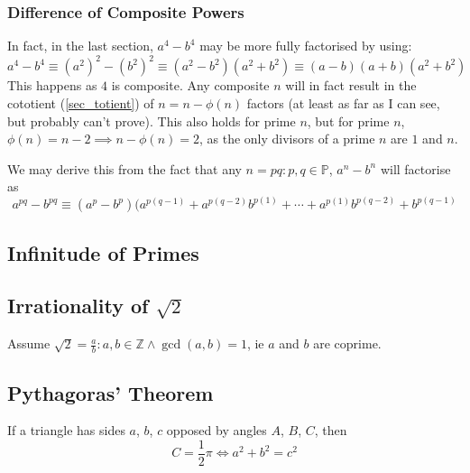 \documentclass[fleqn,a4paper,11pt]{article}
\begin{document}
    \subsubsection{Difference of Composite Powers}

    In fact, in the last section, \(a^4 - b^4\) may be more fully factorised by
    using:
    \begin{equation*}
    a^4 - b^4 \equiv (a^2)^2 - (b^2)^2 \equiv (a^2 - b^2)(a^2 + b^2) \equiv
        (a - b)(a + b)(a^2 + b^2)
    \end{equation*}
    This happens as \(4\) is composite. Any composite \(n\) will in fact result
    in the cototient (\ref{sec_totient}) of \(n = n - \phi(n)\) factors (at
    least as far as I can see, but probably can't prove). This
    also holds for prime \(n\), but for prime \(n\),
    \(\phi(n) = n - 2 \implies n - \phi(n) = 2\), as the only divisors of
    a prime \(n\) are \(1\) and \(n\).

    We may derive this from the fact that any \(n = pq: p, q \in \mathbb{P}\),
    \(a^n - b^n\) will factorise as
    \begin{equation}
    a^{pq} - b^{pq} \equiv
     (a^p - b^p)(a^{p(q - 1)} + a^{p(q - 2)}b^{p(1)} + \dotsb +
                 a^{p(1)}b^{p(q - 2)} + b^{p(q - 1)}
    \end{equation}

    \subsection{Infinitude of Primes}

    \subsection[Irrationality of \(\sqrt 2\)]
               {Irrationality of \boldmath\(\sqrt 2\)}

    Assume \(\sqrt 2 = \frac ab : a, b \in \mathbb{Z} \land \gcd(a, b) = 1\), ie
    \(a\) and \(b\) are coprime.

    \subsection{Pythagoras' Theorem} \label{sec_pythagoras}


    If a triangle has sides \(a\), \(b\), \(c\) opposed by angles \(A\), \(B\),
    \(C\), then
    \begin{equation}
    C = \frac 12 \pi \iff a^2 + b^2 = c^2
    \end{equation}
\end{document}

